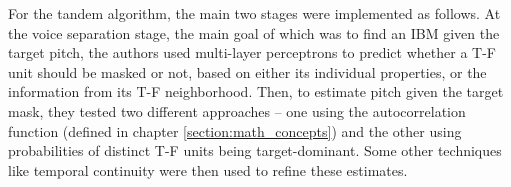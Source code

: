 For the tandem algorithm, the main two stages were implemented as follows. At the voice separation stage, the main goal of which was to find an IBM given the target pitch, the authors used multi-layer perceptrons to predict whether a T-F unit should be masked or not, based on either its individual properties, or the information from its T-F neighborhood. Then, to estimate pitch given the target mask, they tested two different approaches -- one using the autocorrelation function (defined in chapter \ref{section:math_concepts}) and the other using probabilities of distinct T-F units being target-dominant. Some other techniques like temporal continuity were then used to refine these estimates.

